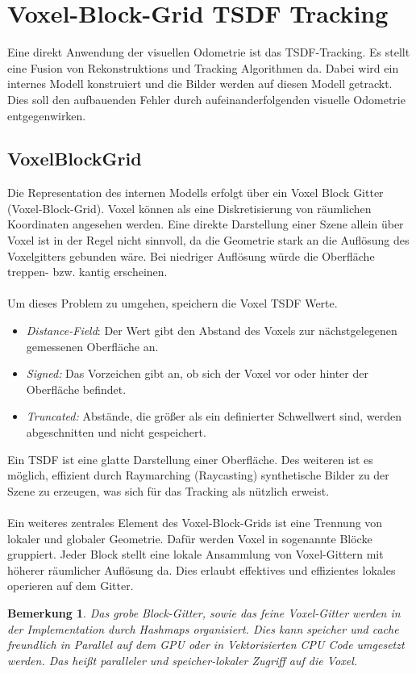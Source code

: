 \documentclass[12pt,DIV=15,BCOR=15mm,twoside,headsepline,abstract=true,listof=totoc,bibliography=totoc]{scrreprt}
\newtheorem{remark}{Bemerkung}[chapter]
\theoremstyle{remark}    %
\begin{document}
    \section{Voxel-Block-Grid TSDF Tracking}
    Eine direkt Anwendung der visuellen Odometrie ist das \ac{TSDF}-Tracking. Es stellt eine Fusion von Rekonstruktions und Tracking Algorithmen da.
    Dabei wird ein internes Modell konstruiert und die Bilder werden auf diesen Modell getrackt. Dies soll den aufbauenden Fehler durch aufeinanderfolgenden visuelle Odometrie entgegenwirken.
    \subsection{VoxelBlockGrid}
    Die Representation des internen Modells erfolgt über ein Voxel Block Gitter (Voxel-Block-Grid). 
    Voxel können als eine Diskretisierung von räumlichen Koordinaten angesehen werden. Eine direkte Darstellung einer Szene allein über 
    Voxel ist in der Regel nicht sinnvoll, da die Geometrie stark an die Auflösung des Voxelgitters gebunden wäre. Bei niedriger Auflösung würde die 
    Oberfläche treppen- bzw. kantig erscheinen.\\\\
    Um dieses Problem zu umgehen, speichern die Voxel \ac{TSDF} Werte. 
    \begin{itemize}
        \item \emph{Distance-Field}: Der Wert gibt den Abstand des Voxels zur nächstgelegenen gemessenen Oberfläche an.
        \item \emph{Signed:} Das Vorzeichen gibt an, ob sich der Voxel vor oder hinter der Oberfläche befindet.
        \item \emph{Truncated:}  Abstände, die größer als ein definierter Schwellwert sind, werden abgeschnitten und nicht gespeichert.
    \end{itemize}
    Ein \ac{TSDF} ist eine glatte Darstellung einer Oberfläche. 
    Des weiteren ist es möglich, effizient durch Raymarching (Raycasting) synthetische Bilder zu der Szene zu erzeugen, was sich für das Tracking als 
    nützlich erweist.\cite{dong2023ashmodernframeworkparallel}\\\\  
    Ein weiteres zentrales Element des Voxel-Block-Grids ist eine Trennung von lokaler und globaler Geometrie. Dafür werden Voxel in sogenannte Blöcke
    gruppiert. Jeder Block stellt eine lokale Ansammlung von Voxel-Gittern mit höherer räumlicher Auflösung da. Dies erlaubt effektives 
    und effizientes lokales operieren auf dem Gitter.
    \begin{remark}
    Das grobe Block-Gitter, sowie das feine Voxel-Gitter werden in der Implementation durch Hashmaps organisiert. Dies kann speicher und 
    cache freundlich in Parallel auf dem GPU oder in Vektorisierten CPU Code umgesetzt werden. Das heißt paralleler und speicher-lokaler Zugriff auf die 
    Voxel. \cite{dong2023ashmodernframeworkparallel}
    \end{remark}
\end{document}
